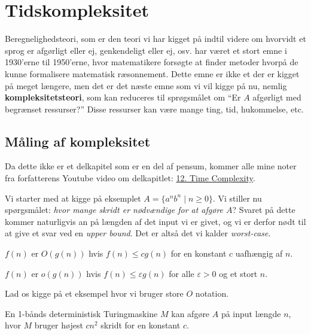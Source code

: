 \chapter{Tidskompleksitet}
Beregnelighedsteori, som er den teori vi har kigget på indtil videre om hvorvidt et sprog er afgørligt eller ej, genkendeligt eller ej, osv. har været et stort emne i 1930'erne til 1950'erne, hvor matematikere forsøgte at finder metoder hvorpå de kunne formalisere matematisk ræsonnement. Dette emne er ikke et der er kigget på meget længere, men det er det næste emne som vi vil kigge på nu, nemlig \textbf{kompleksitetsteori}, som kan reduceres til sprøgsmålet om ``Er $A$ afgørligt med begrænset ressurser?'' Disse ressurser kan være mange ting, tid, hukommelse, etc.

\section{Måling af kompleksitet}%
\label{sec:measuringcomplexity}

Da dette ikke er et delkapitel som er en del af pensum, kommer alle mine noter fra forfatterens Youtube video om delkapitlet: \href{https://www.youtube.com/watch?v=asjAc90L8rE&list=PLidiQIHRzpXIFFbyGrWkqXXVj0BztDcTF&index=12}{12. Time Complexity}.

Vi starter med at kigge på eksemplet $A = \{a^{n}b^{n} \mid n \ge 0\}$. Vi stiller nu spørgsmålet: \textit{hvor mange skridt er nødvændige for at afgøre $A$}? Svaret på dette kommer naturligvis an på længden af det input vi er givet, og vi er derfor nødt til at give et svar ved en \textit{upper bound}. Det er altså det vi kalder \textit{worst-case}.

\begin{definition}[Store $O$]
$f(n)$ er $O(g(n))$ hvis $f(n) \le cg(n)$ for en konstant $c$ uafhængig af $n$.
\end{definition}

\begin{definition}[Lille $o$]
$f(n)$ er $o(g(n))$ hvis $f(n) \le \varepsilon g(n)$ for alle $\varepsilon > 0$ og et stort $n$.
\end{definition}

Lad os kigge på et eksempel hvor vi bruger store $O$ notation.

\begin{theorem}
En 1-bånds deterministisk Turingmaskine $M$ kan afgøre $A$ på input længde $n$, hvor $M$ bruger højest $cn^{2}$ skridt for en konstant $c$.
\end{theorem}

